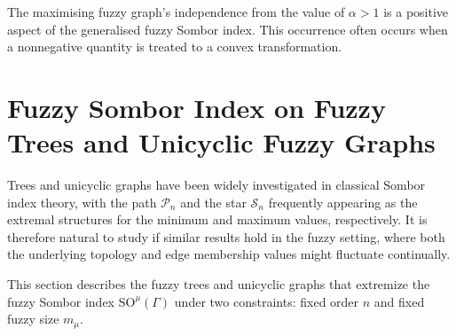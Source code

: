 \documentclass[12pt]{amsart}
\newcommand{\SOG}{\mathrm{SO}^{\mu}}
\newcommand{\PP}{\mathcal{P}}
\newcommand{\SN}{\mathcal{S}}
\begin{document}
The maximising fuzzy graph's independence from the value of $\alpha > 1$ is a positive aspect of the generalised fuzzy Sombor index. This occurrence often occurs when a nonnegative quantity is treated to a convex transformation.
\section{Fuzzy Sombor Index on Fuzzy Trees and Unicyclic Fuzzy Graphs}

Trees and unicyclic graphs have been widely investigated in classical Sombor index theory, with the path $\PP_n$ and the star $\SN_n$ frequently appearing as the extremal structures for the minimum and maximum values, respectively. It is therefore natural to study if similar results hold in the fuzzy setting, where both the underlying topology and edge membership values might fluctuate continually.

This section describes the fuzzy trees and unicyclic graphs that extremize the fuzzy Sombor index $\SOG(\Gamma)$ under two constraints: fixed order $n$ and fixed fuzzy size $m_{\mu}$.
\end{document}
